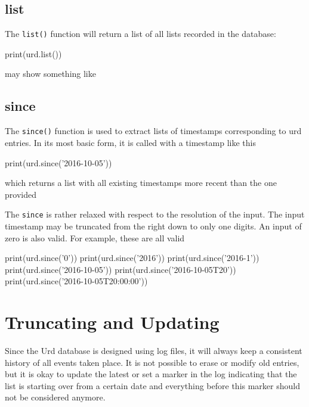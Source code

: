\subsection{list}
The \texttt{list()} function will return a list of all lists recorded in
the database:
\begin{python}
print(urd.list())
\end{python}
may show something like
\begin{shell}
\end{shell}


\subsection{since}
The \texttt{since()} function is used to extract lists of timestamps
corresponding to urd entries.  In its most basic form, it is called
with a timestamp like this
\begin{python}
print(urd.since('2016-10-05'))
\end{python}
which returns a list with all existing timestamps more recent than the
one provided
\begin{shell}
['2016-10-06', '2016-10-07', '2016-10-08', '2016-10-09', '2016-10-09T20']
\end{shell}
The \texttt{since} is rather relaxed with respect to the resolution of
the input.  The input timestamp may be truncated from the right down
to only one digits.  An input of zero is also valid.  For example,
these are all valid
\begin{python}
print(urd.since('0'))
print(urd.since('2016'))
print(urd.since('2016-1'))
print(urd.since('2016-10-05'))
print(urd.since('2016-10-05T20'))
print(urd.since('2016-10-05T20:00:00'))
\end{python}







\section{Truncating and Updating}
\label{sec:trunc-update}
Since the Urd database is designed using log files, it will always
keep a consistent history of all events taken place.  It is not
possible to erase or modify old entries, but it is okay to update the
latest or set a marker in the log indicating that the list is starting
over from a certain date and everything before this marker should not
be considered anymore.

